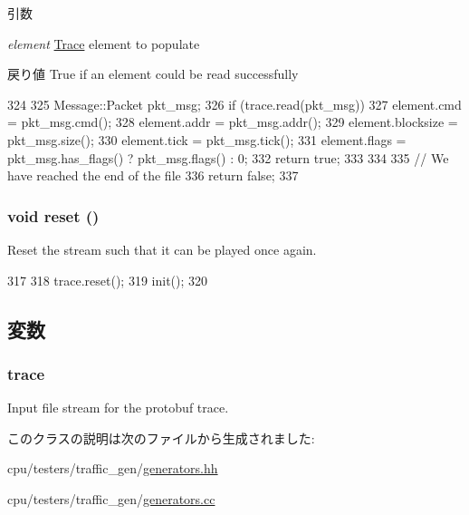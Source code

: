 \begin{DoxyParams}{引数}
\item[{\em element}]\hyperlink{namespaceTrace}{Trace} element to populate \end{DoxyParams}
\begin{DoxyReturn}{戻り値}
True if an element could be read successfully 
\end{DoxyReturn}



\begin{DoxyCode}
324 {
325     Message::Packet pkt_msg;
326     if (trace.read(pkt_msg)) {
327         element.cmd = pkt_msg.cmd();
328         element.addr = pkt_msg.addr();
329         element.blocksize = pkt_msg.size();
330         element.tick = pkt_msg.tick();
331         element.flags = pkt_msg.has_flags() ? pkt_msg.flags() : 0;
332         return true;
333     }
334 
335     // We have reached the end of the file
336     return false;
337 }
\end{DoxyCode}
\hypertarget{classTraceGen_1_1InputStream_ad20897c5c8bd47f5d4005989bead0e55}{
\subsubsection[{reset}]{\setlength{\rightskip}{0pt plus 5cm}void reset ()}}
\label{classTraceGen_1_1InputStream_ad20897c5c8bd47f5d4005989bead0e55}
Reset the stream such that it can be played once again. 


\begin{DoxyCode}
317 {
318     trace.reset();
319     init();
320 }
\end{DoxyCode}


\subsection{変数}
\hypertarget{classTraceGen_1_1InputStream_aeea802262475e8c5d837e45e63ed5fa9}{
\subsubsection[{trace}]{ {\bf trace}}}
\label{classTraceGen_1_1InputStream_aeea802262475e8c5d837e45e63ed5fa9}


Input file stream for the protobuf trace. 

このクラスの説明は次のファイルから生成されました:\begin{DoxyCompactItemize}
\item 
cpu/testers/traffic\_\-gen/\hyperlink{generators_8hh}{generators.hh}\item 
cpu/testers/traffic\_\-gen/\hyperlink{generators_8cc}{generators.cc}\end{DoxyCompactItemize}
